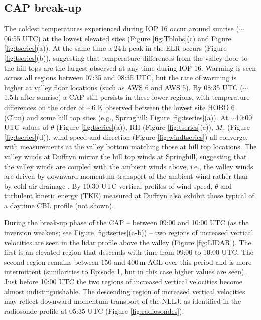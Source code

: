 \documentclass[times]{qjrms4}
\begin{document}
\subsection{CAP break-up}
\label{ep4}
The coldest temperatures experienced during IOP 16 occur around sunrise ($\sim$06:55 UTC) at the lowest elevated sites (Figure \ref{fig:Tblobs}(c) and Figure \ref{fig:tseries}(a)). At the same time a 24$\,\mbox{h}$ peak in the ELR occurs (Figure \ref{fig:tseries}(b)), suggesting that temperature differences from the valley floor to the hill tops are the largest observed at any time during IOP 16. Warming is seen across all regions between 07:35 and 08:35 UTC, but the rate of warming is higher at valley floor locations (such as AWS 6 and AWS 5). By 08:35 UTC ($\sim$1.5$\,\mbox{h}$ after sunrise) a CAP still persists in these lower regions, with temperature differences on the order of $\sim$6 K observed between the lowest site HOBO 6 (Clun) and some hill top sites (e.g., Springhill; Figure \ref{fig:tseries}(a)). At $\sim$10:00 UTC values of $\theta$ (Figure \ref{fig:tseries}(a)), RH (Figure \ref{fig:tseries}(c)), $M_r$ (Figure \ref{fig:tseries}(d)), wind speed and direction (Figure \ref{fig:windtseries}) all converge, with measurements at the valley bottom matching those at hill top locations. The valley winds at Duffryn mirror the hill top winds at Springhill, suggesting that the valley winds are coupled with the ambient winds above, i.e., the valley winds are driven by downward momentum transport of the ambient wind rather than by cold air drainage \citep{whiteman1993relationship}. By 10:30 UTC vertical profiles of wind speed, $\theta$ and turbulent kinetic energy (TKE) measured at Duffryn also exhibit those typical of a daytime CBL profile (not shown).

During the break-up phase of the CAP -- between 09:00 and 10:00 UTC (as the inversion weakens; see Figure \ref{fig:tseries}(a-b)) -- two regions of increased vertical velocities are seen in the lidar profile above the valley (Figure \ref{fig:LIDAR}). The first is an elevated region that descends with time from 09:00 to 10:00 UTC. The second region remains between 150 and 400$\,\mbox{m}$ AGL over this period and is more intermittent (similarities to Episode 1, but in this case higher values are seen). Just before 10:00 UTC the two regions of increased vertical velocities become almost indistinguishable. The descending region of increased vertical velocities may reflect downward momentum transport of the NLLJ, as identified in the radiosonde profile at 05:35 UTC (Figure \ref{fig:radiosondes}). 
\end{document}

